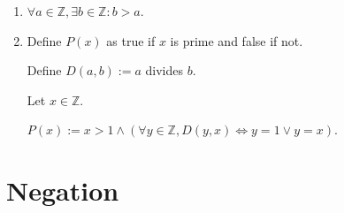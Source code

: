 \documentclass{article}
\begin{document}
\begin{enumerate}[label=\alph*)]
    
    \item
    $\forall a \in \mathbb{Z}, \exists b \in \mathbb{Z} : b > a$.
    
    \item
    Define $P(x)$ as true if $x$ is prime and false if not. 
    
    Define $D(a,b) := a$ divides $b$. 
    
    Let $x \in \mathbb{Z}$.
    
    $P(x) := x > 1 \land (\forall y \in \mathbb{Z}, D(y, x) \Leftrightarrow y=1 \lor y=x)$.
    
    
    
    
    
    
    
    
    
\end{enumerate}
    

\section{Negation}
\end{document}
